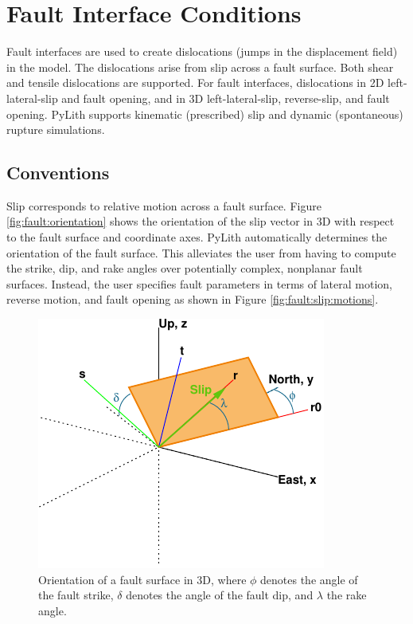 \section{Fault Interface Conditions}
\label{sec:fault}

Fault interfaces are used to create dislocations (jumps in the
displacement field) in the model. The dislocations arise from slip
across a fault surface. Both shear and tensile dislocations are
supported. For fault interfaces, dislocations in 2D left-lateral-slip and
fault opening, and in 3D left-lateral-slip, reverse-slip, and fault
opening. PyLith supports kinematic (prescribed) slip and dynamic
(spontaneous) rupture simulations.


\subsection{Conventions}

Slip corresponds to relative motion across a fault surface. Figure
\vref{fig:fault:orientation} shows the orientation of the slip vector
in 3D with respect to the fault surface and coordinate axes. PyLith
automatically determines the orientation of the fault surface. This
alleviates the user from having to compute the strike, dip, and rake
angles over potentially complex, nonplanar fault surfaces. Instead,
the user specifies fault parameters in terms of lateral motion, reverse
motion, and fault opening as shown in Figure \vref{fig:fault:slip:motions}.

\begin{figure}[htbp]
  \includegraphics{physics/figs/faultOrientation}
  \caption{Orientation of a fault surface in 3D, where $\phi$ denotes the angle
    of the fault strike, $\delta$ denotes the angle of the fault dip,
    and $\lambda$ the rake angle.}
  \label{fig:fault:orientation} 
\end{figure}

